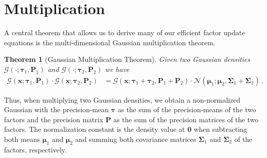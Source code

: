 \documentclass[a4paper]{article}
\newcommand{\Normal}[3]{{\mathcal N} \left({#1};{#2},{#3}\right)}
\newcommand{\Gauss}[3]{{\mathcal G} \left({#1};{#2},{#3}\right)}
\newcommand{\bs}[1]{{\boldsymbol{#1}}}
\newtheorem{theorem}{Theorem}
\theoremstyle{definition}
\begin{document}
\section*{Multiplication}
A central theorem that allows us to derive many of our efficient factor update equations is the multi-dimensional Gaussian multiplication theorem.
\begin{theorem}[Gaussian Multiplication Theorem] \label{thm:gaussian_multiplication}
    Given two Gaussian densities $\Gauss{\cdot}{\bs{\tau}_1}{\bs{P}_1}$ and $\Gauss{\cdot}{\bs{\tau}_2}{\bs{P}_2}$ we have
    \begin{align*}
        \Gauss{\bs{x}}{\bs{\tau}_1}{\bs{P}_1} \cdot \Gauss{\bs{x}}{\bs{\tau}_2}{\bs{P}_2} & = \Gauss{\bs{x}}{\bs{\tau}_1 + \bs{\tau}_2}{\bs{P}_1 + \bs{P}_2} \cdot \Normal{\bs{\mu}_1}{\bs{\mu}_2}{\bs{\Sigma}_1 + \bs{\Sigma}_2}\,.
    \end{align*}
\end{theorem}
Thus, when multiplying two Gaussian densities, we obtain a non-normalized Gaussian with the precision-mean $\bs{\tau}$ as the sum of the precision-means of the two factors and the precision matrix $\bs{P}$ as the sum of the precision matrices of the two factors. The normalization constant is the density value at $\bs{0}$ when subtracting both means $\bs{\mu}_1$ and $\bs{\mu}_2$ and summing both covariance matrices $\bs{\Sigma}_1$ and $\bs{\Sigma}_2$ of the factors, respectively. 
\end{document}
